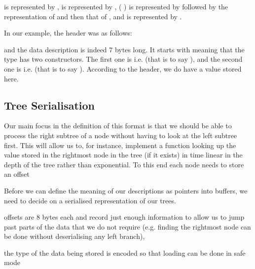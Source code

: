 is represented by ,
 is represented by ,
(  ) is represented by
 followed by the representation of  and then that of ,
and  is represented by .


In our example, the header was as follows:
\begin{hexdump}
 
\end{hexdump}
\noindent and the data description is indeed 7 bytes long. It starts with 
meaning that the type has two constructors.
The first one is  i.e.  (that is to say ),
and the second one is  i.e.
\IdrisKeyword{(} 
\IdrisKeyword{(}  \IdrisKeyword{))}
(that is to say ).
%
According to the header, we do have a  value stored here.

\subsection{Tree Serialisation}

Our main focus in the definition of this format is that we should be able
to process the right subtree of a node without having to look at the left
subtree first.
%
This will allow us to, for instance, implement a function looking up the
value stored in the rightmost node in the tree (if it exists) in time linear
in the depth of the tree rather than exponential.
%
To this end each node needs to store an offset

Before we can define the meaning of our descriptions as pointers
into buffers, we need to decide on a serialised representation of
our trees.



offsets are 8 bytes each and record just enough information to
allow us to jump past parts of the data that we do not require (e.g. finding
the rightmost node can be done without deserialising any left branch),

the type of the data being stored is encoded so that loading
can be done in safe mode

